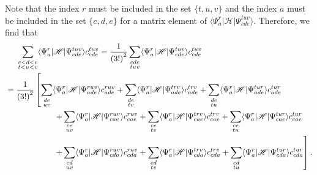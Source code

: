 \documentclass[a4paper]{book}
\begin{document}
	\begin{solution}
	
	Note that the index $r$ must be included in the set $\{ t, u, v \}$ and the index $a$ must be included in the set $\{ c,d,e\}$ for a matrix element of $\langle \Psi^r_a | \mathscr{H} | \Psi^{tuv}_{cde} \rangle$. Therefore, we find that
	\begin{align*}
		&\hspace{1.4em}\sum_{ \substack{ c<d<e \\ t<u<v } } \langle \Psi^r_a | \mathscr{H} | \Psi^{tuv}_{cde} \rangle c^{tuv}_{cde} = \frac{1}{\left(3!\right)^2} \sum_{ \substack{ cde \\ tuv} } \langle \Psi^r_a | \mathscr{H} | \Psi^{tuv}_{cde} \rangle c^{tuv}_{cde} \\
		&= \frac{1}{\left(3!\right)^2}  \left[ \sum_{ \substack{ de \\ uv } } \langle \Psi^r_a | \mathscr{H} | \Psi^{ruv}_{ade} \rangle c^{ruv}_{ade} + \sum_{ \substack{ de \\ tv } } \langle \Psi^r_a | \mathscr{H} | \Psi^{trv}_{ade} \rangle c^{trv}_{ade} + \sum_{ \substack{ de \\ tu } } \langle \Psi^r_a | \mathscr{H} | \Psi^{tur}_{ade} \rangle c^{tur}_{ade} \right. \\
		&\hspace{ 6em } \left. + \sum_{ \substack{ ce \\ uv } } \langle \Psi^r_a | \mathscr{H} | \Psi^{ruv}_{cae} \rangle c^{ruv}_{cae} + \sum_{ \substack{ ce \\ tv } } \langle \Psi^r_a | \mathscr{H} | \Psi^{trv}_{cae} \rangle c^{trv}_{cae} + \sum_{ \substack{ ce \\ tu } } \langle \Psi^r_a | \mathscr{H} | \Psi^{tur}_{cae} \rangle c^{tur}_{cae} \right. \\
		&\hspace{ 6em } \left. + \sum_{ \substack{ cd \\ uv } } \langle \Psi^r_a | \mathscr{H} | \Psi^{ruv}_{cda} \rangle c^{ruv}_{cda} + \sum_{ \substack{ cd \\ tv } } \langle \Psi^r_a | \mathscr{H} | \Psi^{trv}_{cda} \rangle c^{trv}_{cda} + \sum_{ \substack{ cd \\ tu } } \langle \Psi^r_a | \mathscr{H} | \Psi^{tur}_{cda} \rangle c^{tur}_{cda} \right] .
	\end{align*}
	

\end{solution}
\end{document}
